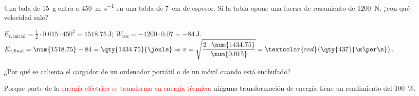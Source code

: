 \begin{exercise}
    Una bala de \qty{15}{\gram} entra a \qty{450}{\m\per\s} en una tabla de \qty{7}{\cm} de espesor. Si la tabla opone una fuerza de rozamiento de \qty{1200}{\newton}, ¿con qué velocidad sale?
    \begin{solu}
        \(E_{c,\text{inicial}} = \frac{1}{2} \cdot \num{0.015} \cdot 450^2 = \qty{1518.75}{\joule}\); \(W_{\text{roz}} = -1200 \cdot \num{0.07} = \qty{-84}{\joule}\).
        \(E_{c,\text{final}} = \num{1518.75} - 84 = \qty{1434.75}{\joule} \Rightarrow v = \sqrt{\dfrac{2 \cdot \num{1434.75}}{\num{0.015}}} = \textcolor{red}{\qty{437}{\m\per\s}}\).
    \end{solu}
\end{exercise}

\begin{exercise}
    ¿Por qué se calienta el cargador de un ordenador portátil o de un móvil cuando está enchufado?
    \begin{solu}
        Porque parte de la \textcolor{red}{energía eléctrica se transforma en energía térmica}: ninguna transformación de energía tiene un rendimiento del \qty{100}{\percent}.
    \end{solu}
\end{exercise}
